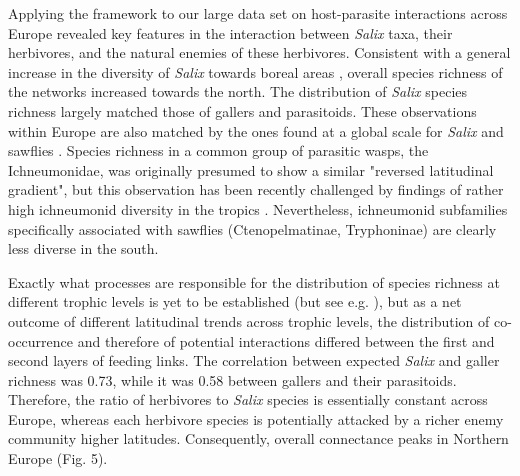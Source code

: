\documentclass[12pt]{article}
\begin{document}
Applying the framework to our large data set on host-parasite interactions
across Europe revealed key features in the interaction between \textit{Salix}
taxa, their herbivores, and the natural enemies of these herbivores.
Consistent with a general increase in the diversity of \textit{Salix} towards
boreal areas \citep{Cronk2015}, overall species richness of the networks
increased towards the north. The distribution of \textit{Salix} species
richness largely matched those of gallers and parasitoids. These observations
within Europe are also matched by the ones found at a global scale for
\textit{Salix} \citep{Argus1997, Cronk2015, Wu2015} and sawflies
\citep{Kouki1994, Kouki1999}. Species richness in a common group of parasitic
wasps, the Ichneumonidae, was originally presumed to show a similar "reversed
latitudinal gradient", but this observation has been recently challenged by
findings of rather high ichneumonid diversity in the tropics
\citep{Veijalainen2013}. Nevertheless, ichneumonid subfamilies specifically
associated with sawflies (Ctenopelmatinae, Tryphoninae) are clearly less
diverse in the south.

Exactly what processes are responsible for the distribution of species
richness at different trophic levels is yet to be established (but see e.g.
\citealt{Roininen2005, Nyman2010, Leppanen2014}), but as a net outcome of
different latitudinal trends across trophic levels, the distribution of co-occurrence and therefore of potential interactions differed between the first
and second layers of feeding links. The correlation between expected
\textit{Salix} and galler richness was 0.73, while it was 0.58 between
gallers and their parasitoids. Therefore, the ratio of herbivores to
\textit{Salix} species is essentially constant across Europe, whereas each
herbivore species is potentially attacked by a richer enemy community higher
latitudes. Consequently, overall connectance peaks in Northern Europe (Fig.
5).
\end{document}
